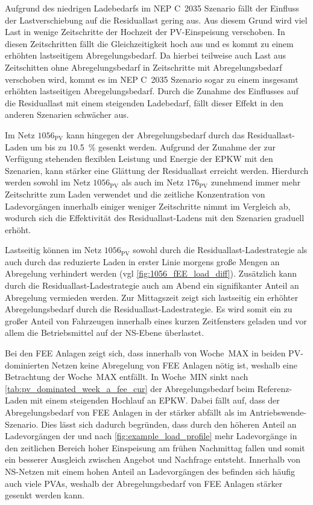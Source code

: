 Aufgrund des niedrigen Ladebedarfs im NEP C~\num{2035} Szenario fällt der Einfluss der Lastverschiebung auf die Residuallast gering aus.
Aus diesem Grund wird viel Last in wenige Zeitschritte der Hochzeit der \gls{PV}-Einspeisung verschoben.
In diesen Zeitschritten fällt die Gleichzeitigkeit hoch aus und es kommt zu einem erhöhten lastseitigem Abregelungsbedarf.
Da hierbei teilweise auch Last aus Zeitschitten ohne Abregelungsbedarf in Zeitschritte mit Abregelungsbedarf verschoben wird, kommt es im NEP C~\num{2035} Szenario sogar zu einem insgesamt erhöhten lastseitigen Abregelungsbedarf.
Durch die Zunahme des Einflusses auf die Residuallast mit einem steigenden Ladebedarf, fällt dieser Effekt in den anderen Szenarien schwächer aus.\medskip

Im Netz \(1056_{\text{PV}}\) kann hingegen der Abregelungsbedarf durch das Residuallast-Laden um bis zu \SI{10.5}{\percent} gesenkt werden.
Aufgrund der Zunahme der zur Verfügung stehenden flexiblen Leistung und Energie der \gls{EPKW} mit den Szenarien, kann stärker eine Glättung der Residuallast erreicht werden.
Hierdurch werden sowohl im Netz \(1056_{\text{PV}}\) als auch im Netz \(176_{\text{PV}}\) zunehmend immer mehr Zeitschritte zum Laden verwendet und die zeitliche Konzentration von Ladevorgängen innerhalb einiger weniger Zeitschritte nimmt im Vergleich ab, wodurch sich die Effektivität des Residuallast-Ladens mit den Szenarien graduell erhöht.\medskip

Lastseitig können im Netz \(1056_{\text{PV}}\) sowohl durch die Residuallast-Ladestrategie als auch durch das reduzierte Laden in erster Linie morgens große Mengen an Abregelung verhindert werden (vgl \autoref{fig:1056_fEE_load_diff}).
Zusätzlich kann durch die Residuallast-Ladestrategie auch am Abend ein signifikanter Anteil an Abregelung vermieden werden.
Zur Mittagszeit zeigt sich lastseitig ein erhöhter Abregelungsbedarf durch die Residuallast-Ladestrategie.
Es wird somit ein zu großer Anteil von Fahrzeugen innerhalb eines kurzen Zeitfensters geladen und vor allem die Betriebsmittel auf der \gls{NS}-Ebene überlastet.



Bei den \gls{FEE} Anlagen zeigt sich, dass innerhalb von Woche~MAX in beiden \gls{PV}-dominierten Netzen keine Abregelung von \gls{FEE} Anlagen nötig ist, weshalb eine Betrachtung der Woche~MAX entfällt.
In Woche~MIN sinkt nach \autoref{tab:pv_dominated_week_a_fee_cur} der Abregelungsbedarf beim Referenz-Laden mit einem steigenden Hochlauf an \gls{EPKW}.
Dabei fällt auf, dass der Abregelungsbedarf von \gls{FEE} Anlagen in der \SzeFirmenparkplatz stärker abfällt als im Antriebswende-Szenario.
Dies lässt sich dadurch begründen, dass durch den höheren Anteil an Ladevorgängen der \UCs \oeffen und \zH nach \autoref{fig:example_load_profile} mehr Ladevorgänge in den zeitlichen Bereich hoher Einspeisung am frühen Nachmittag fallen und somit ein besserer Ausgleich zwischen Angebot und Nachfrage entsteht.
Innerhalb von \gls{NS}-Netzen mit einem hohen Anteil an Ladevorgängen des \UC \zH befinden sich häufig auch viele \glspl{PVA}, weshalb der Abregelungsbedarf von \gls{FEE} Anlagen stärker gesenkt werden kann.


